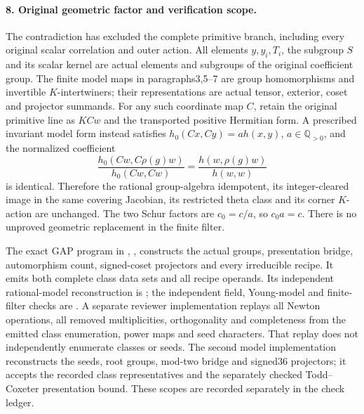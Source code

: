\paragraph{8. Original geometric factor and verification scope.}
The contradiction has excluded the complete primitive branch,
including every original scalar correlation and outer action.
All elements \(y,y_i,T_i\), the subgroup \(S\) and its scalar
kernel are actual elements and subgroups of the original
coefficient group. The finite model maps in paragraphs3,5--7
are group homomorphisms and invertible \(K\)-intertwiners;
their representations are actual tensor, exterior, coset and
projector summands. For any such coordinate map \(C\), retain
the original primitive line as \(KCw\) and the transported
positive Hermitian form. A prescribed invariant model form
instead satisfies \(h_0(Cx,Cy)=a h(x,y)\), \(a\in\mathbb Q_{>0}\),
and the normalized coefficient
\[
 \frac{h_0(Cw,C\rho(g)w)}{h_0(Cw,Cw)}
                    =\frac{h(w,\rho(g)w)}{h(w,w)}           \tag{G33.21}
\]
is identical. Therefore the rational group-algebra idempotent,
its integer-cleared image in the same covering Jacobian, its
restricted theta class and its corner \(K\)-action are unchanged.
The two Schur factors are \(c_0=c/a\), so \(c_0a=c\).
There is no unproved geometric replacement in the finite filter.

The exact GAP program in ,
,
constructs the actual groups, presentation bridge, automorphism
count, signed-coset projectors and every irreducible recipe.
It emits both complete class data sets and all recipe operands.
Its independent rational-model reconstruction is
;
the independent field, Young-model and finite-filter checks are
.
A separate reviewer implementation replays all Newton operations,
all removed multiplicities, orthogonality and completeness from
the emitted class enumeration, power maps and seed characters.
That replay does not independently enumerate classes or seeds.
The second model implementation reconstructs the seeds, root
groups, mod-two bridge and signed36 projectors; it accepts the
recorded class representatives and the separately checked
Todd--Coxeter presentation bound. These scopes are recorded
separately in the check ledger.
